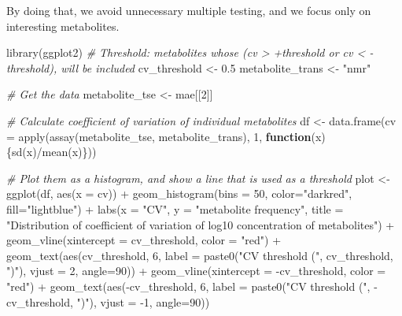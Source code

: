 \documentclass[
  oneside]{book}
\newenvironment{Shaded}{\begin{snugshade}}{\end{snugshade}}
\newcommand{\AttributeTok}[1]{\textcolor[rgb]{0.77,0.63,0.00}{#1}}
\newcommand{\CommentTok}[1]{\textcolor[rgb]{0.56,0.35,0.01}{\textit{#1}}}
\newcommand{\ControlFlowTok}[1]{\textcolor[rgb]{0.13,0.29,0.53}{\textbf{#1}}}
\newcommand{\DecValTok}[1]{\textcolor[rgb]{0.00,0.00,0.81}{#1}}
\newcommand{\FloatTok}[1]{\textcolor[rgb]{0.00,0.00,0.81}{#1}}
\newcommand{\FunctionTok}[1]{\textcolor[rgb]{0.00,0.00,0.00}{#1}}
\newcommand{\NormalTok}[1]{#1}
\newcommand{\OtherTok}[1]{\textcolor[rgb]{0.56,0.35,0.01}{#1}}
\newcommand{\SpecialCharTok}[1]{\textcolor[rgb]{0.00,0.00,0.00}{#1}}
\newcommand{\StringTok}[1]{\textcolor[rgb]{0.31,0.60,0.02}{#1}}
\begin{document}
By doing that, we avoid unnecessary multiple testing, and we focus only on interesting
metabolites.

\begin{Shaded}
\begin{Highlighting}[]
\FunctionTok{library}\NormalTok{(ggplot2)}
\CommentTok{\# Threshold: metabolites whose (cv \textgreater{} +threshold or cv \textless{} {-}threshold), will be included}
\NormalTok{cv\_threshold }\OtherTok{\textless{}{-}} \FloatTok{0.5}
\NormalTok{metabolite\_trans }\OtherTok{\textless{}{-}} \StringTok{"nmr"}

\CommentTok{\# Get the data}
\NormalTok{metabolite\_tse }\OtherTok{\textless{}{-}}\NormalTok{ mae[[}\DecValTok{2}\NormalTok{]]}

\CommentTok{\# Calculate coefficient of variation of individual metabolites}
\NormalTok{df }\OtherTok{\textless{}{-}} \FunctionTok{data.frame}\NormalTok{(}\AttributeTok{cv =} \FunctionTok{apply}\NormalTok{(}\FunctionTok{assay}\NormalTok{(metabolite\_tse, metabolite\_trans), }\DecValTok{1}\NormalTok{, }
                            \ControlFlowTok{function}\NormalTok{(x)\{}\FunctionTok{sd}\NormalTok{(x)}\SpecialCharTok{/}\FunctionTok{mean}\NormalTok{(x)\}))}

\CommentTok{\# Plot them as a histogram, and show a line that is used as a threshold}
\NormalTok{plot }\OtherTok{\textless{}{-}} \FunctionTok{ggplot}\NormalTok{(df, }\FunctionTok{aes}\NormalTok{(}\AttributeTok{x =}\NormalTok{ cv)) }\SpecialCharTok{+}
  \FunctionTok{geom\_histogram}\NormalTok{(}\AttributeTok{bins =} \DecValTok{50}\NormalTok{, }\AttributeTok{color=}\StringTok{"darkred"}\NormalTok{, }\AttributeTok{fill=}\StringTok{"lightblue"}\NormalTok{) }\SpecialCharTok{+}
  \FunctionTok{labs}\NormalTok{(}\AttributeTok{x =} \StringTok{"CV"}\NormalTok{, }\AttributeTok{y =} \StringTok{"metabolite frequency"}\NormalTok{, }
       \AttributeTok{title =} \StringTok{"Distribution of coefficient of }
\StringTok{       variation of log10 concentration of metabolites"}\NormalTok{) }\SpecialCharTok{+}
  \FunctionTok{geom\_vline}\NormalTok{(}\AttributeTok{xintercept =}\NormalTok{ cv\_threshold, }\AttributeTok{color =} \StringTok{"red"}\NormalTok{) }\SpecialCharTok{+}
  \FunctionTok{geom\_text}\NormalTok{(}\FunctionTok{aes}\NormalTok{(cv\_threshold, }\DecValTok{6}\NormalTok{, }\AttributeTok{label =} 
                  \FunctionTok{paste0}\NormalTok{(}\StringTok{"CV threshold ("}\NormalTok{, cv\_threshold, }\StringTok{")"}\NormalTok{), }\AttributeTok{vjust =} \DecValTok{2}\NormalTok{, }\AttributeTok{angle=}\DecValTok{90}\NormalTok{)) }\SpecialCharTok{+}
  \FunctionTok{geom\_vline}\NormalTok{(}\AttributeTok{xintercept =} \SpecialCharTok{{-}}\NormalTok{cv\_threshold, }\AttributeTok{color =} \StringTok{"red"}\NormalTok{) }\SpecialCharTok{+}
  \FunctionTok{geom\_text}\NormalTok{(}\FunctionTok{aes}\NormalTok{(}\SpecialCharTok{{-}}\NormalTok{cv\_threshold, }\DecValTok{6}\NormalTok{, }\AttributeTok{label =} 
                  \FunctionTok{paste0}\NormalTok{(}\StringTok{"CV threshold ("}\NormalTok{, }\SpecialCharTok{{-}}\NormalTok{cv\_threshold, }\StringTok{")"}\NormalTok{), }\AttributeTok{vjust =} \SpecialCharTok{{-}}\DecValTok{1}\NormalTok{, }\AttributeTok{angle=}\DecValTok{90}\NormalTok{))}


\end{Highlighting}
\end{Shaded}
\end{document}
